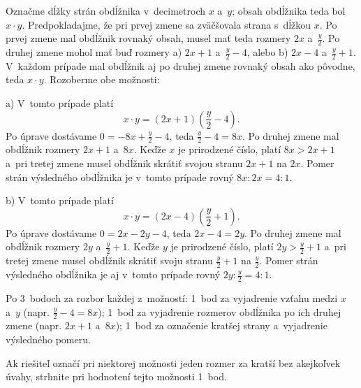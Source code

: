 {%
Označme dĺžky strán obdĺžnika v~decimetroch $x$ a~$y$; obsah obdĺžnika teda bol $x\cdot y$.
Predpokladajme, že pri prvej zmene sa zväčšovala strana s~dĺžkou $x$.
Po prvej zmene mal obdĺžnik rovnaký obsah, musel mať teda rozmery $2x$ a~$\frac{y}2$.
Po druhej zmene mohol mať buď rozmery a) $2x+1$ a~$\frac{y}2-4$, alebo b) $2x-4$ a~$\frac{y}2+1$.
V~každom prípade mal obdĺžnik aj po druhej zmene rovnaký obsah ako pôvodne,
teda $x\cdot y$.
Rozoberme obe možnosti:

a) V~tomto prípade platí
$$
x\cdot y=(2x+1)\left(\frac{y}2-4\right).
$$
Po úprave dostávame $0=-8x+\frac{y}2-4$, teda $\frac{y}2-4=8x$.
Po druhej zmene mal obdĺžnik rozmery $2x+1$ a~$8x$.
Keďže $x$ je prirodzené číslo, platí $8x>2x+1$ a~pri tretej zmene musel
obdĺžnik skrátiť svojou stranu $2x+1$ na $2x$.
Pomer strán výsledného obdĺžnika je v~tomto prípade rovný $8x:2x=4:1$.

b) V~tomto prípade platí
$$
x\cdot y=(2x-4)\left(\frac{y}2+1\right).
$$
Po úprave dostávame $0=2x-2y-4$, teda $2x-4=2y$.
Po druhej zmene mal obdĺžnik rozmery $2y$ a~$\frac{y}2+1$.
Keďže $y$ je prirodzené číslo, platí $2y>\frac{y}2+1$ a~pri tretej zmene
musel obdĺžnik skrátiť svoju stranu $\frac{y}2+1$ na $\frac{y}2$.
Pomer strán výsledného obdĺžnika je aj v~tomto prípade rovný
$2y:\frac{y}2=4:1$.

\hodnotenie
Po 3~bodoch za rozbor každej z~možností:
1~bod za vyjadrenie vzťahu medzi $x$ a~$y$ (napr. $\frac{y}2-4=8x$);
1~bod za vyjadrenie rozmerov obdĺžnika po ich druhej zmene (napr. $2x+1$
a~$8x$);
1~bod za označenie kratšej strany a~vyjadrenie výsledného pomeru.

Ak riešiteľ označí pri niektorej možnosti jeden rozmer za kratší bez akejkoľvek
úvahy, strhnite pri hodnotení tejto možnosti 1~bod.
\endhodnotenie
}

